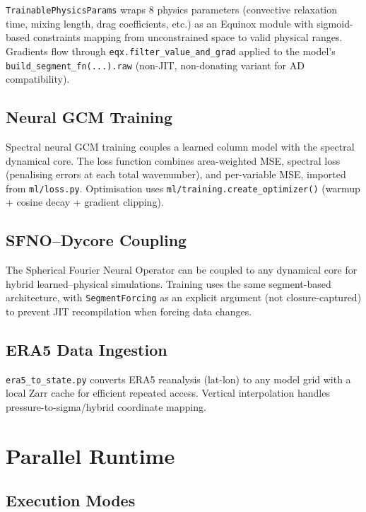 \documentclass[11pt,twoside]{report}
\begin{document}
\texttt{TrainablePhysicsParams} wraps 8 physics parameters (convective
relaxation time, mixing length, drag coefficients, etc.) as an Equinox
module with sigmoid-based constraints mapping from unconstrained space to
valid physical ranges.  Gradients flow through
\texttt{eqx.filter\_value\_and\_grad} applied to the model's
\texttt{build\_segment\_fn(...).raw} (non-JIT, non-donating variant for AD
compatibility).

\section{Neural GCM Training}

Spectral neural GCM training couples a learned column model with the
spectral dynamical core.  The loss function combines area-weighted MSE,
spectral loss (penalising errors at each total wavenumber), and
per-variable MSE, imported from \texttt{ml/loss.py}.  Optimisation uses
\texttt{ml/training.create\_optimizer()} (warmup + cosine decay + gradient
clipping).

\section{SFNO--Dycore Coupling}

The Spherical Fourier Neural Operator can be coupled to any dynamical
core for hybrid learned--physical simulations.  Training uses the same
segment-based architecture, with \texttt{SegmentForcing} as an explicit
argument (not closure-captured) to prevent JIT recompilation when forcing
data changes.

\section{ERA5 Data Ingestion}

\texttt{era5\_to\_state.py} converts ERA5 reanalysis (lat-lon) to any
model grid with a local Zarr cache for efficient repeated access.
Vertical interpolation handles pressure-to-sigma/hybrid coordinate
mapping.


\chapter{Parallel Runtime}
\label{ch:parallel}

\section{Execution Modes}
\end{document}
